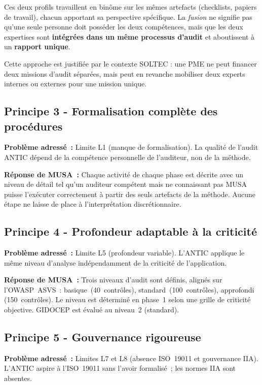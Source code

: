 \documentclass[12pt,a4paper,oneside]{report}
\begin{document}
Ces deux profils travaillent en binôme sur les mêmes artefacts 
(checklists, papiers de travail), chacun apportant sa perspective 
spécifique. La \textit{fusion} ne signifie pas qu'une seule personne 
doit posséder les deux compétences, mais que les deux expertises 
sont \textbf{intégrées dans un même processus d'audit} et aboutissent 
à un \textbf{rapport unique}.

Cette approche est justifiée par le contexte SOLTEC : une PME ne 
peut financer deux missions d'audit séparées, mais peut en revanche 
mobiliser deux experts internes ou externes pour une mission unique.
\subsection{Principe 3 - Formalisation compl\`ete des proc\'edures}

\textbf{Probl\`eme adress\'e~:} Limite L1 (manque de formalisation). La qualit\'e
de l'audit ANTIC d\'epend de la comp\'etence personnelle de l'auditeur, non de la
m\'ethode.

\textbf{R\'eponse de MUSA~:} Chaque activit\'e de chaque phase est d\'ecrite avec
un niveau de d\'etail tel qu'un auditeur comp\'etent mais ne connaissant pas
MUSA puisse l'ex\'ecuter correctement \`a partir des seuls artefacts de la m\'ethode.
Aucune \'etape ne laisse de place \`a l'interpr\'etation discr\'etionnaire.

\subsection{Principe 4 - Profondeur adaptable \`a la criticit\'e}

\textbf{Probl\`eme adress\'e~:} Limite L5 (profondeur variable). L'ANTIC applique
le m\^eme niveau d'analyse ind\'ependamment de la criticit\'e de l'application.

\textbf{R\'eponse de MUSA~:} Trois niveaux d'audit sont d\'efinis, align\'es sur
l'OWASP~ASVS~: basique~(40~contr\^oles), standard~(100~contr\^oles), approfondi
(150~contr\^oles). Le niveau est d\'etermin\'e en phase~1 selon une grille de
criticit\'e objective. GIDOCEP est \'evalu\'e au niveau~2 (standard).

\subsection{Principe 5 - Gouvernance rigoureuse}

\textbf{Probl\`eme adress\'e~:} Limites L7 et L8 (absence ISO~19011 et gouvernance
IIA). L'ANTIC aspire \`a l'ISO~19011 sans l'avoir formalis\'e~; les normes IIA sont
absentes.
\end{document}
